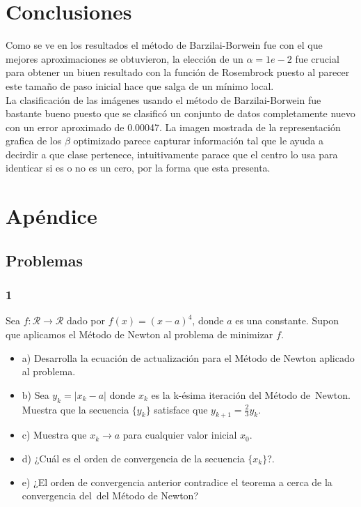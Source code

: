\documentclass[conference]{IEEEtran}
\begin{document}
\section{Conclusiones}

Como se ve en los resultados el método de Barzilai-Borwein fue con el que mejores aproximaciones se
obtuvieron, la elección de un $\alpha = 1e-2$ fue crucial para obtener un biuen resultado con la
función de Rosembrock puesto al parecer este tamaño de paso inicial hace que salga de un mínimo
local.\\

La clasificación de las imágenes usando el método de Barzilai-Borwein fue bastante bueno puesto que
se clasificó un conjunto de datos completamente nuevo con un error aproximado de 0.00047. La imagen
mostrada de la representación grafica de los $\beta$ optimizado parece capturar información tal que
le ayuda a decirdir a que clase pertenece, intuitivamente parace que el centro lo usa para identicar
si es o no es un cero, por la forma que esta presenta.

\section{Apéndice}

\subsection{Problemas}

\subsubsection*{1}

Sea $f: \mathcal{R} \rightarrow \mathcal{R}$ dado por $f(x) = (x-a)^4$, donde $a$ es una constante.
Supon que aplicamos el Método de Newton al problema de minimizar $f$.

\begin{itemize}
	\item a) Desarrolla la ecuación de actualización para el Método de Newton aplicado al problema.
	\item b) Sea $y_{k} = | x_{k} - a|$ donde $x_{k}$ es la k-ésima iteración del Método de\
	Newton. Muestra que la secuencia $\{y_{k}\}$  satisface que $y_{k+1} = \frac{2}{3}y_{k}$.
	\item c) Muestra que $x_{k} \rightarrow a$ para cualquier valor inicial $x_{0}$.
	\item d) ¿Cuál es el orden de convergencia de la secuencia $\{x_{k}\}$?.
	\item e) ¿El orden de convergencia anterior contradice el teorema a cerca de la convergencia del\
	del Método de Newton?
\end{itemize}
\end{document}
